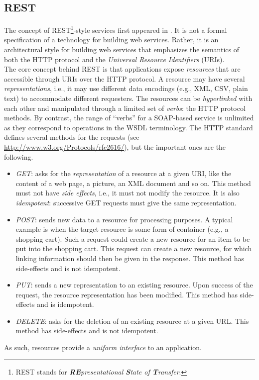 
\subsection{REST}


The concept of REST\footnote{REST stands for \emph{\textbf{RE}presentational \textbf{S}tate of \textbf{T}ransfer}.}-style services first appeared in \cite{RTF00}. It is not a formal specification of a technology for building web services. Rather, it is an architectural style for building web services that emphasizes the semantics of both the HTTP protocol and the \emph{Universal Resource Identifiers} (URIs).\\

The core concept behind REST is that applications expose \emph{resources} that are accessible through URIs over the HTTP protocol. A resource may have several \emph{representations}, i.e., it may use different data encodings (e.g., XML, CSV, plain text) to accommodate different requesters. The resources can be \emph{hyperlinked} with each other and manipulated through a limited set of \emph{verbs}: the HTTP protocol methods. By contrast, the range of ``verbs'' for a SOAP-based service is unlimited as they correspond to operations in the WSDL terminology. The HTTP standard defines several methods for the requests (see \url{http://www.w3.org/Protocols/rfc2616/}), but the important ones are the following.
\begin{itemize}

  \item \emph{GET}: asks for the \emph{representation} of a resource at a given URI, like the content of a web page, a picture, an XML document and so on. This method must not have \emph{side effects}, i.e., it must not modify the resource. It is also \emph{idempotent}: successive GET requests must give the same representation.

  \item \emph{POST}: sends new data to a resource for processing purposes. A typical example is when the target resource is some form of container (e.g., a shopping cart). Such a request could create a new resource for an item to be put into the shopping cart. This request can create a new resource, for which linking information should then be given in the response. This method has side-effects and is not idempotent.

  \item \emph{PUT}: sends a new representation to an existing resource. Upon success of the request, the resource representation has been modified. This method has side-effects and is idempotent.

  \item \emph{DELETE}: asks for the deletion of an existing resource at a given URL. This method has side-effects and is not idempotent.

\end{itemize}
As such, resources provide a \emph{uniform interface} to an application.\\

